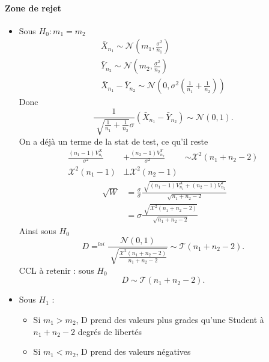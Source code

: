 \documentclass{article}
\theoremstyle{plain}%
\theoremstyle{definition}
\theoremstyle{remark}
\begin{document}
\paragraph*{Zone de rejet}
\begin{itemize}
    \item Sous $ H_0 : m_1 = m_2$ \begin{align*}
        \bar{X}_{n_1} \sim \mathcal{N}(m_1, \frac{\sigma ^2}{n_1}) \\
        \bar{Y}_{n_2} \sim \mathcal{N}(m_2, \frac{\sigma ^2}{n_2}) \\
        \bar{X}_{n_1} - \bar{Y}_{n_2} \sim \mathcal{N}(0, \sigma ^2 (\frac{1}{n_1} + \frac{1}{n_2}))
    \end{align*}
    Donc 
    \[
        \frac{1}{\sqrt[]{\frac{1}{n_1} + \frac{1}{n_2}} \sigma } (\bar{X}_{n_1} - \bar{Y}_{n_2}) \sim \mathcal{N}(0,1)
    .\]
    On a déjà un terme de la stat de test, ce qu'il reste 
    \begin{align*}
        \frac{(n_1 - 1) V_{n_1}^X}{\sigma ^2} &+ \frac{(n_2 - 1)V_{n_2}^Y}{\sigma ^2} &\sim \mathcal{X}^2 (n_1 + n_2 - 2) \\
        \mathcal{X}^2(n_1 -1) & \bot \mathcal{X}^2(n_2 - 1) &
    \end{align*}
    \begin{align*}
        \sqrt[]{W} &= \frac{\sigma }{\sigma } \frac{\sqrt[]{(n_1 - 1) V_{n_1}^X + (n_2 -1) V_{n_2}^Y}}{\sqrt[]{n_1 + n_2 - 2}} \\
            &= \sigma \frac{\sqrt[]{\mathcal{X}^2(n_1 + n_2 - 2)}}{\sqrt[]{n_1 + n_2 - 2}}
    \end{align*}
    Ainsi sous $ H_0 $ 
    \[
        D =^{loi} \frac{\mathcal{N}(0,1)}{\sqrt[]{\frac{\mathcal{X}^2(n_1 + n_2 - 2)}{n_1 + n_2 - 2}}} \sim \mathcal{T}(n_1 + n_2 - 2)
    .\]
    CCL à retenir : sous $ H_0 $ 
    \[
        D \sim \mathcal{T}(n_1 + n_2 - 2)
    .\]
    \item Sous $ H_1 $ : \begin{itemize}
        \item Si $ m_1 > m_2 $, D prend des valeurs plus grades qu'une Student à $ n_1 + n_2 -2 $ degrés de libertés
        \item Si $ m_1 < m_2 $, D prend des valeurs négatives
    \end{itemize}
\end{itemize}
\end{document}
